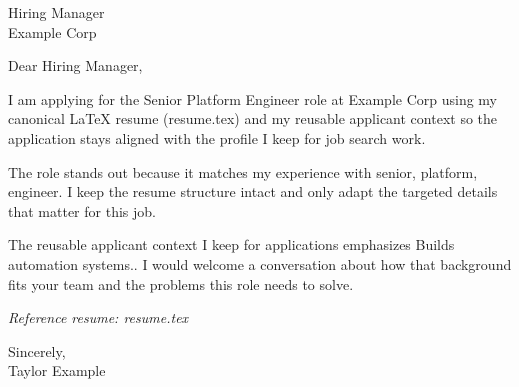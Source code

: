 \documentclass[11pt]{letter}
\begin{document}
\begin{letter}{Hiring Manager \\ Example Corp}
\opening{Dear Hiring Manager,}

I am applying for the Senior Platform Engineer role at Example Corp using my canonical LaTeX resume (resume.tex) and my reusable applicant context so the application stays aligned with the profile I keep for job search work.

The role stands out because it matches my experience with senior, platform, engineer. I keep the resume structure intact and only adapt the targeted details that matter for this job.

The reusable applicant context I keep for applications emphasizes Builds automation systems.. I would welcome a conversation about how that background fits your team and the problems this role needs to solve.



\noindent\emph{Reference resume: resume.tex}

\closing{Sincerely, \\ Taylor Example}
\end{letter}
\end{document}
